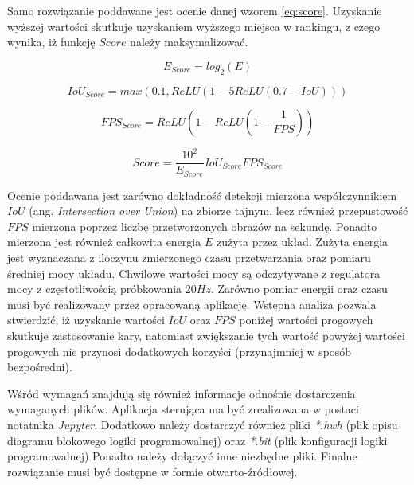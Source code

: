 Samo rozwiązanie poddawane jest ocenie danej wzorem \eqref{eq:score}. Uzyskanie wyższej wartości skutkuje uzyskaniem wyższego miejsca w rankingu, z czego wynika, iż funkcję $Score$ należy maksymalizować. 

\begin{equation}
E_{Score} = log_2(E)
\label{eq:e_score}
\end{equation}

\begin{equation}
IoU_{Score} = max(0.1, ReLU(1 - 5 ReLU(0.7 - IoU)))
\label{eq:iou_score}
\end{equation}

\begin{equation}
FPS_{Score} = ReLU(1 - ReLU( 1 - \frac{1}{FPS}))
\label{eq:fps_score}
\end{equation}

\begin{equation}
Score = \frac{10^2}{E_{Score}} IoU_{Score} FPS_{Score}
\label{eq:score}
\end{equation}

Ocenie poddawana jest zarówno dokładność detekcji mierzona współczynnikiem $IoU$ (ang. \emph{Intersection over Union}) na zbiorze tajnym, lecz również przepustowość $FPS$ mierzona poprzez liczbę przetworzonych obrazów na sekundę. 
Ponadto mierzona jest również całkowita energia $E$ zużyta przez układ. 
Zużyta energia jest wyznaczana z iloczynu zmierzonego czasu przetwarzania oraz pomiaru średniej mocy układu. 
Chwilowe wartości mocy są odczytywane z regulatora mocy z częstotliwością próbkowania $20 Hz$.
Zarówno pomiar energii oraz czasu musi być realizowany przez opracowaną aplikację.
Wstępna analiza pozwala stwierdzić, iż uzyskanie wartości $IoU$ oraz $FPS$ poniżej wartości progowych skutkuje zastosowanie kary, natomiast
zwiększanie tych wartość powyżej wartości progowych nie przynosi dodatkowych korzyści (przynajmniej w sposób bezpośredni). 


Wśród wymagań znajdują się również informacje odnośnie dostarczenia wymaganych plików.
Aplikacja sterująca ma być zrealizowana w postaci notatnika \emph{Jupyter}.
Dodatkowo należy dostarczyć również pliki \emph{*.hwh} (plik opisu diagramu blokowego logiki programowalnej)
oraz \emph{*.bit} (plik konfiguracji logiki programowalnej) Ponadto należy dołączyć inne niezbędne pliki. 
Finalne rozwiązanie musi być dostępne w formie otwarto-źródłowej.

